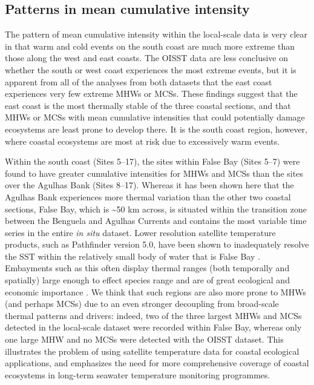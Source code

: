 \documentclass[a4paper,10pt,review]{elsarticle}
\begin{document}
\subsection{Patterns in mean cumulative intensity}
The pattern of mean cumulative intensity within the local-scale data is very clear in that warm and cold events on the south coast are much more extreme than those along the west and east coasts. The OISST data are less conclusive on whether the south or west coast experiences the most extreme events, but it is apparent from all of the analyses from both datasets that the east coast experiences very few extreme MHWs or MCSs. These findings suggest that the east coast is the most thermally stable of the three coastal sections, and that MHWs or MCSs with mean cumulative intensities that could potentially damage ecosystems are least prone to develop there. It is the south coast region, however, where coastal ecosystems are most at risk due to excessively warm events.

Within the south coast (Sites 5--17), the sites within False Bay (Sites 5--7) were found to have greater cumulative intensities for MHWs and MCSs than the sites over the Agulhas Bank (Sites 8--17). Whereas it has been shown here that the Agulhas Bank experiences more thermal variation than the other two coastal sections, False Bay, which is \textasciitilde50 km across, is situated within the transition zone between the Benguela and Agulhas Currents \citep{Smit2013} and contains the most variable time series in the entire \emph{in situ} dataset. Lower resolution satellite temperature products, such as Pathfinder version 5.0, have been shown to inadequately resolve the SST within the relatively small body of water that is False Bay \citep{Dufois2012}. Embayments such as this often display thermal ranges (both temporally and spatially) large enough to effect species range \citep{Ling2009} and are of great ecological \citep{Klumb2003} and economic importance \citep{Lugendo2005}. We think that such regions are also more prone to MHWs (and perhaps MCSs) due to an even stronger decoupling from broad-scale thermal patterns and drivers: indeed, two of the three largest MHWs and MCSs detected in the local-scale dataset were recorded within False Bay, whereas only one large MHW and no MCSs were detected with the OISST dataset. This illustrates the problem of using satellite temperature data for coastal ecological applications, and emphasizes the need for more comprehensive coverage of coastal ecosystems in long-term seawater temperature monitoring programmes.
\end{document}
